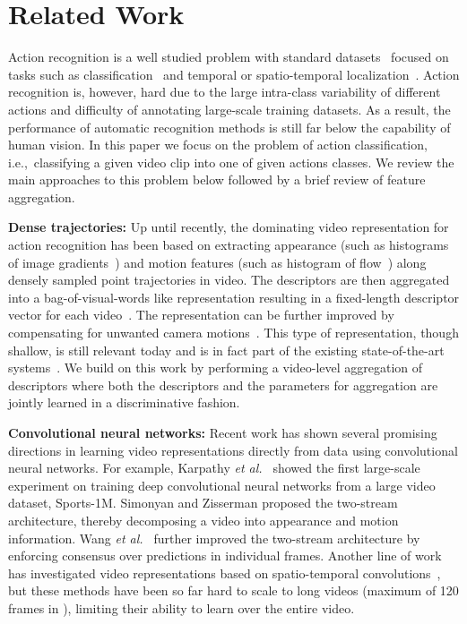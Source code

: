 \documentclass[10pt,twocolumn,letterpaper]{article}
\newcommand{\etalWspace}[0]{{\it et al.\ }}
\begin{document}
 \section{Related Work}




Action recognition is a well studied problem with standard datasets~\cite{youtube8M,2016trecvidawad,THUMOS15,hmdb51,charades,ucf101} focused on tasks
such as classification~\cite{Feichtenhofer_16,Simonyan_14b,IDT_Wang_13,WangL_16a,WangX_16a} and
temporal or spatio-temporal localization~\cite{Kang_16,Weinzaepfel_15,Yeung_15}. 
Action recognition is, however, hard due to the large intra-class variability of different actions and difficulty of annotating large-scale training datasets. As a result, the performance of automatic recognition methods is still far below the capability of human vision. In this paper we focus on the problem of action classification, i.e.,\ classifying a given video clip into one of  given actions classes. We review the main approaches to this problem below followed by a brief review of feature aggregation.


{\bf Dense trajectories:}
Up until recently, the dominating video representation for action recognition has been based on extracting
appearance (such as histograms of image gradients~\cite{Dalal05}) and motion features (such as histogram of flow~\cite{Dalal06})
along densely sampled point trajectories in video. The descriptors are then aggregated into a bag-of-visual-words like representation resulting in a fixed-length descriptor vector for each video~\cite{WangCVPR11,WangBMVC09}. The representation can be further improved by compensating for unwanted camera motions~\cite{IDT_Wang_13}. 
This type of representation, though shallow, is still relevant today and is in fact 
part of the existing state-of-the-art systems~\cite{Feichtenhofer_16,Varol_16,WangL_15a}.
We build on this work by performing a video-level aggregation of descriptors
where both the descriptors and the parameters
for aggregation are jointly learned in
a discriminative fashion.



{\bf Convolutional neural networks:}
Recent work has shown several promising directions in learning video representations directly from data using convolutional neural networks.
For example, Karpathy \etalWspace\cite{Karpathy_14} showed the first large-scale
experiment on training deep convolutional neural networks from a large video
dataset, Sports-1M. Simonyan and Zisserman\cite{Simonyan_14b}
proposed the two-stream architecture, thereby
decomposing a video into appearance and motion information.
Wang \etalWspace\cite{WangL_16a} further improved the two-stream architecture
by
enforcing consensus over predictions in individual frames.
Another line of work has investigated video representations based on spatio-temporal convolutions~\cite{Tran_15,Varol_16}, but these methods have been so far hard to scale to long videos (maximum of 120 frames in \cite{Varol_16}), limiting their ability to learn
over the entire video.
\end{document}
